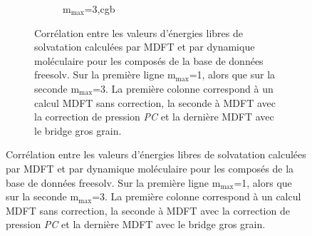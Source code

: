 \begin{figure}
\begin{figure}[H]
\begin{subfigure}[b]{0.30\textwidth}
{          }
       \label{fig:correlation_avec_sans_cgb:mmax$3_pc}
    \end{subfigure}
   \begin{subfigure}[b]{0.30\textwidth}
       \centering
       \caption{$\mathrm{m}_\mathrm{max}$=3,cgb}
       \label{fig:correlation_avec_sans_cgb:mmax3_cgb}
    \end{subfigure}
    
    
  \caption{Corrélation entre les valeurs d'énergies libres de solvatation calculées par MDFT et par dynamique moléculaire pour les composés de la base de données freesolv. Sur la première ligne $\mathrm{m}_\mathrm{max}$=1, alors que sur la seconde $\mathrm{m}_\mathrm{max}$=3. La première colonne correspond à un calcul MDFT sans correction, la seconde à MDFT avec la correction de pression \textit{PC} et la dernière MDFT avec le bridge gros grain. }
  \label{fig:correlation_avec_sans_cgb}
\end{figure}
\end{figure}



